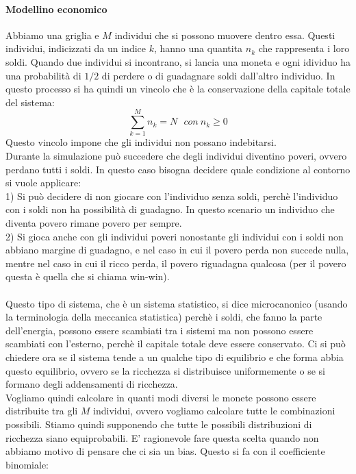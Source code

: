 \documentclass[12pt]{article}
\begin{document}
\paragraph*{Modellino economico \\}
Abbiamo una griglia e $M$ individui che si possono muovere dentro essa. Questi individui, indicizzati da un indice $k$, hanno una quantita $n_k$ che rappresenta i loro soldi. Quando due individui si incontrano, si lancia una moneta e ogni idividuo ha una probabilità di $1/2$ di perdere o di guadagnare soldi dall'altro individuo. In questo processo si ha quindi un vincolo che è la conservazione della capitale totale del sistema:
\begin{equation}
	\sum_{k=1}^M n_k = N \ \ \ con \ n_k \geq 0
\end{equation}
Questo vincolo impone che gli individui non possano indebitarsi. \\
Durante la simulazione può succedere che degli individui diventino poveri, ovvero perdano tutti i soldi. In questo caso bisogna decidere quale condizione al contorno si vuole applicare: \\
1) Si può decidere di non giocare con l'individuo senza soldi, perchè l'individuo con i soldi non ha possibilità di guadagno. In questo scenario un individuo che diventa povero rimane povero per sempre. \\
2) Si gioca anche con gli individui poveri nonostante gli individui con i soldi non abbiano margine di guadagno, e nel caso in cui il povero perda non succede nulla, mentre nel caso in cui il ricco perda, il povero riguadagna qualcosa (per il povero questa è quella che si chiama win-win). \\ \\
Questo tipo di sistema, che è un sistema statistico, si dice microcanonico (usando la terminologia della meccanica statistica) perchè i soldi, che fanno la parte dell'energia, possono essere scambiati tra i sistemi ma non possono essere scambiati con l'esterno, perchè il capitale totale deve essere conservato. Ci si può chiedere ora se il sistema tende a un qualche tipo di equilibrio e che forma abbia questo equilibrio, ovvero se la ricchezza si distribuisce uniformemente o se si formano degli addensamenti di ricchezza. \\
Vogliamo quindi calcolare in quanti modi diversi le monete possono essere distribuite tra gli $M$ individui, ovvero vogliamo calcolare tutte le combinazioni possibili. Stiamo quindi supponendo che tutte le possibili distribuzioni di ricchezza siano equiprobabili. E' ragionevole fare questa scelta quando non abbiamo motivo di pensare che ci sia un bias. Questo si fa con il coefficiente binomiale:
\end{document}
